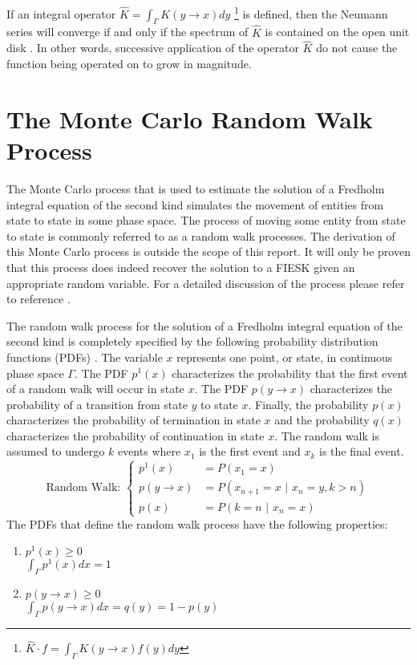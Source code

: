 If an integral operator $\hat{K} = \int_{\Gamma} K(y \to x)dy$
\footnote{$\hat{K} \cdot f = \int_{\Gamma} K(y \to x)f(y)dy$} is defined, then 
the Neumann series will converge if and only if the spectrum of $\hat{K}$ is 
contained on the open unit disk \citep{rahman_integral_2007,morse_methods_1953,spanier_monte_1969}. In other words, successive application of the operator
$\hat{K}$ do not cause the function being operated on to grow in magnitude.

\section{The Monte Carlo Random Walk Process}
\label{sec:mc_random_walk_process}
The Monte Carlo process that is used to estimate the solution of a Fredholm
integral equation of the second kind simulates the movement of entities from
state to state in some phase space. The process of moving some entity from
state to state is commonly referred to as a random walk processes. The 
derivation of this Monte Carlo process is outside the scope of this report. It 
will only be proven that this process does indeed recover the solution to a 
FIESK given an appropriate random variable. For a detailed discussion of the 
process please refer to reference \cite{spanier_monte_1969}. 

The random walk process for the solution of a Fredholm integral equation of
the second kind is completely specified by the following probability
distribution functions (PDFs) \citep{spanier_monte_1969}. The variable $x$ 
represents one point, or state, in continuous phase space $\Gamma$. The 
PDF $p^1(x)$ characterizes the probability that the first event of a random 
walk will occur in state $x$. The PDF $p(y \to x)$ characterizes the probability
of a transition from state $y$ to state $x$. Finally, the probability $p(x)$
characterizes the probability of termination in state $x$ and the probability
$q(x)$ characterizes the probability of continuation in state $x$. The random 
walk is assumed to undergo $k$ events where $x_1$ is the first event and $x_k$ 
is the final event.
\begin{equation}
  \text{Random Walk: }
  \begin{cases}
    p^1(x) & = P(x_1 = x) \\
    p(y \to x) & = P(x_{n+1} = x \text{ | } x_n = y, k > n)  \\
    p(x) & = P(k = n \text{ | } x_n = x) 
  \end{cases}
  \label{eq:mc_random_walk_pdfs}
\end{equation}
The PDFs that define the random walk process have the following properties:
\begin{enumerate}
  \item $p^1(x) \geq 0$ \\
  $\int_{\Gamma} p^1(x)dx = 1$
  \item $p(y \to x) \geq 0$ \\
  $\int_{\Gamma} p(y \to x)dx = q(y) = 1 - p(y)$
\end{enumerate}

